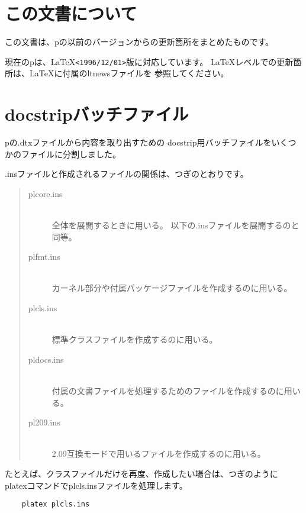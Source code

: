 \documentclass{plnews}
\author{中野 賢（\texttt{ken-na at ascii.co.jp}）}
\begin{document}
\maketitle

\section{この文書について}
この文書は、p\LaTeXe{}の以前のバージョンからの更新箇所をまとめたものです。

現在のp\LaTeXe{}は、\LaTeX{}\texttt{<1996/12/01>}版に対応しています。
\LaTeX{}レベルでの更新箇所は、\LaTeX{}に付属のltnewsファイルを
参照してください。

\section{docstripバッチファイル}
p\LaTeXe{}の.dtxファイルから内容を取り出すための
\textsf{docstrip}用バッチファイルをいくつかのファイルに分割しました。

.insファイルと作成されるファイルの関係は、つぎのとおりです。

\begin{quote}
\begin{description}
\item[plcore.ins]\mbox{}\\
    全体を展開するときに用いる。
    以下の{.ins}ファイルを展開するのと同等。
\item[plfmt.ins]\mbox{}\\
    カーネル部分や付属パッケージファイルを作成するのに用いる。
\item[plcls.ins]\mbox{}\\
    標準クラスファイルを作成するのに用いる。
\item[pldocs.ins]\mbox{}\\
    付属の文書ファイルを処理するためのファイルを作成するのに用いる。
\item[pl209.ins]\mbox{}\\
    2.09互換モードで用いるファイルを作成するのに用いる。
\end{description}
\end{quote}

たとえば、クラスファイルだけを再度、作成したい場合は、つぎのように
platexコマンドでplcls.insファイルを処理します。

\begin{verbatim}
    platex plcls.ins
\end{verbatim}
\end{document}
